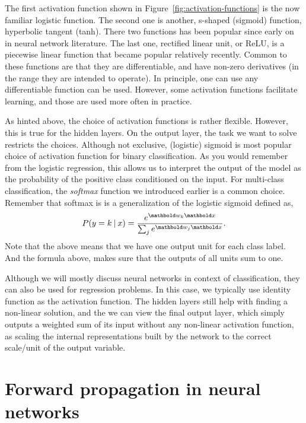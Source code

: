 The first activation function shown in Figure~\ref{fig:activation-functions}
is the now familiar logistic function.
The second one is another, s-shaped (sigmoid) function,
hyperbolic tangent (tanh).
There two functions has been popular since early on
in neural network literature.
The last one, rectified linear unit, or ReLU,
is a piecewise linear function that became popular relatively recently.
Common to these functions are that they are differentiable,
and have non-zero derivatives (in the range they are intended to operate). 
In principle,
one can use any differentiable function can be used.
However, some activation functions facilitate learning,
and those are used more often in practice.

As hinted above,
the choice of activation functions is rather flexible.
However, this is true for the hidden layers.
On the output layer,
the task we want to solve restricts the choices.
Although not exclusive,
(logistic) sigmoid is most popular choice of activation function
for binary classification.
As you would remember from the logistic regression,
this allows us to interpret the output of the model
as the probability of the positive class conditioned on the input.
For multi-class classification,
the \emph{softmax} function we introduced earlier is a common choice.
Remember that softmax is is a generalization of the logistic sigmoid defined as,
\begin{equation*}
  P(y=k\given{}x) = 
    \frac{e^{\vect{w_{k}}\vect{x}}}
         {\sum_{j} e^{\vect{w_{j}}\vect{x}}} .
\end{equation*}
Note that the above means that we have one output unit
for each class label.
And the formula above,
makes sure that the outputs of all units sum to one.

Although we will mostly discuss neural networks in context of classification,
they can also be used for regression problems.
In this case, we typically use identity function as the activation function.
The hidden layers still help with finding a non-linear solution,
and the we can view the final output layer,
which simply outputs a weighted sum of its input without
any non-linear activation function,
as scaling the internal representations built by the 
network to the correct scale/unit of the output variable.

\section{Forward propagation in neural networks}

